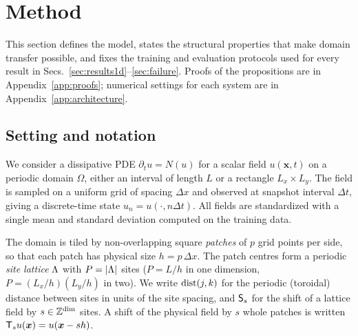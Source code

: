 \section{Method}
\label{sec:method}

This section defines the model, states the structural properties that
make domain transfer possible, and fixes the training and evaluation
protocols used for every result in
Secs.~\ref{sec:results1d}--\ref{sec:failure}. Proofs of the
propositions are in Appendix~\ref{app:proofs}; numerical settings for
each system are in Appendix~\ref{app:architecture}.

\subsection{Setting and notation}
\label{sec:notation}

We consider a dissipative PDE $\partial_t u = N(u)$ for a scalar field
$u(\bm{x},t)$ on a periodic domain $\Omega$, either an interval of length
$L$ or a rectangle $L_x\times L_y$. The field is sampled on a uniform grid
of spacing $\Delta x$ and observed at snapshot interval $\Delta t$, giving
a discrete-time state $u_n = u(\cdot, n\Delta t)$. All fields are
standardized with a single mean and standard deviation computed on the
training data.

The domain is tiled by non-overlapping square \emph{patches} of
$p$ grid points per side, so that each patch has physical size
$h = p\,\Delta x$. The patch centres form a periodic \emph{site lattice}
$\Lambda$ with $P = |\Lambda|$ sites ($P = L/h$ in one dimension,
$P = (L_x/h)(L_y/h)$ in two). We write $\operatorname{dist}(j,k)$ for the periodic
(toroidal) distance between sites in units of the site spacing, and
$\mathsf{S}_s$ for the shift of a lattice field by $s\in\mathbb{Z}^{\dim}$ sites. A
shift of the physical field by $s$ whole patches is written
$\mathsf{T}_{s} u(\bm{x}) = u(\bm{x} - s h)$.

